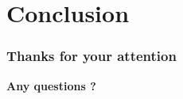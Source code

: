 \section[Ccl.]{Conclusion}
\begin{frame}
\frametitle{ Thanks for your attention}
\begin{center}
\textbf{ Any questions ? }
\end{center}
\end{frame}